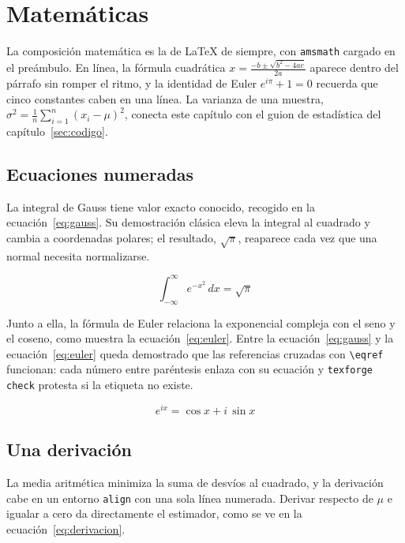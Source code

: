 \section{Matemáticas}\label{sec:matematicas}

La composición matemática es la de \LaTeX{} de siempre, con
\texttt{amsmath} cargado en el preámbulo. En línea, la fórmula
cuadrática $x = \frac{-b \pm \sqrt{b^2 - 4ac}}{2a}$ aparece dentro del
párrafo sin romper el ritmo, y la identidad de Euler $e^{i\pi} + 1 = 0$
recuerda que cinco constantes caben en una línea. La varianza de una
muestra, $\sigma^2 = \frac{1}{n}\sum_{i=1}^{n}(x_i - \mu)^2$, conecta este
capítulo con el guion de estadística del capítulo~\ref{sec:codigo}.

\subsection{Ecuaciones numeradas}

La integral de Gauss tiene valor exacto conocido, recogido en la
ecuación~\eqref{eq:gauss}. Su demostración clásica eleva la integral al
cuadrado y cambia a coordenadas polares; el resultado, $\sqrt{\pi}$,
reaparece cada vez que una normal necesita normalizarse.

\begin{equation}\label{eq:gauss}
  \int_{-\infty}^{\infty} e^{-x^2}\,dx = \sqrt{\pi}
\end{equation}

Junto a ella, la fórmula de Euler relaciona la exponencial compleja con el
seno y el coseno, como muestra la ecuación~\eqref{eq:euler}. Entre la
ecuación~\eqref{eq:gauss} y la ecuación~\eqref{eq:euler} queda
demostrado que las referencias cruzadas con \texttt{\textbackslash eqref}
funcionan: cada número entre paréntesis enlaza con su ecuación y
\texttt{texforge check} protesta si la etiqueta no existe.

\begin{equation}\label{eq:euler}
  e^{ix} = \cos x + i\,\sin x
\end{equation}

\subsection{Una derivación}

La media aritmética minimiza la suma de desvíos al cuadrado, y la
derivación cabe en un entorno \texttt{align} con una sola línea
numerada. Derivar respecto de $\mu$ e igualar a cero da directamente el
estimador, como se ve en la ecuación~\eqref{eq:derivacion}.

